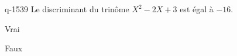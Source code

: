 \begin{truefalse}{q-1539}
Le discriminant du trinôme $X^2-2X+3$ est égal à $-16$.
\item Vrai
\item* Faux
\end{truefalse}

